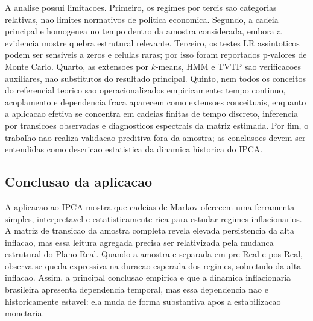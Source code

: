 A analise possui limitacoes. Primeiro, os regimes por tercis sao categorias relativas, nao limites normativos de politica economica. Segundo, a cadeia principal e homogenea no tempo dentro da amostra considerada, embora a evidencia mostre quebra estrutural relevante. Terceiro, os testes LR assintoticos podem ser sensiveis a zeros e celulas raras; por isso foram reportados p-valores de Monte Carlo. Quarto, as extensoes por \(k\)-means, HMM e TVTP sao verificacoes auxiliares, nao substitutos do resultado principal. Quinto, nem todos os conceitos do referencial teorico sao operacionalizados empiricamente: tempo continuo, acoplamento e dependencia fraca aparecem como extensoes conceituais, enquanto a aplicacao efetiva se concentra em cadeias finitas de tempo discreto, inferencia por transicoes observadas e diagnosticos espectrais da matriz estimada. Por fim, o trabalho nao realiza validacao preditiva fora da amostra; as conclusoes devem ser entendidas como descricao estatistica da dinamica historica do IPCA.

\subsection{Conclusao da aplicacao}

A aplicacao ao IPCA mostra que cadeias de Markov oferecem uma ferramenta simples, interpretavel e estatisticamente rica para estudar regimes inflacionarios. A matriz de transicao da amostra completa revela elevada persistencia da alta inflacao, mas essa leitura agregada precisa ser relativizada pela mudanca estrutural do Plano Real. Quando a amostra e separada em pre-Real e pos-Real, observa-se queda expressiva na duracao esperada dos regimes, sobretudo da alta inflacao. Assim, a principal conclusao empirica e que a dinamica inflacionaria brasileira apresenta dependencia temporal, mas essa dependencia nao e historicamente estavel: ela muda de forma substantiva apos a estabilizacao monetaria.
